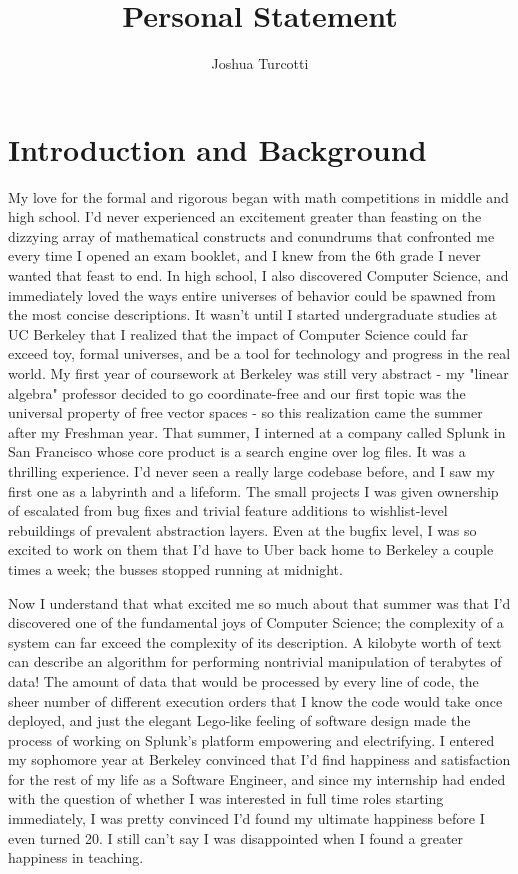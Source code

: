 \documentclass{nsf-grfp}
\title{Personal Statement}
\author{Joshua Turcotti}
\begin{document}
\maketitle

\section*{Introduction and Background}

My love for the formal and rigorous began with math competitions in middle and high school. I'd never experienced an excitement greater than feasting on the dizzying array of mathematical constructs and conundrums that confronted me every time I opened an exam booklet, and I knew from the 6th grade I never wanted that feast to end. In high school, I also discovered Computer Science, and immediately loved the ways entire universes of behavior could be spawned from the most concise descriptions. It wasn't until I started undergraduate studies at UC Berkeley that I realized that the impact of Computer Science could far exceed toy, formal universes, and be a tool for technology and progress in the real world. My first year of coursework at Berkeley was still very abstract - my "linear algebra" professor decided to go coordinate-free and our first topic was the universal property of free vector spaces - so this realization came the summer after my Freshman year. That summer, I interned at a company called Splunk in San Francisco whose core product is a search engine over log files. It was a thrilling experience. I'd never seen a really large codebase before, and I saw my first one as a labyrinth and a lifeform. The small projects I was given ownership of escalated from bug fixes and trivial feature additions to wishlist-level rebuildings of prevalent abstraction layers. Even at the bugfix level, I was so excited to work on them that I'd have to Uber back home to Berkeley a couple times a week; the busses stopped running at midnight. 

Now I understand that what excited me so much about that summer was that I'd discovered one of the fundamental joys of Computer Science; the complexity of a system can far exceed the complexity of its description. A kilobyte worth of text can describe an algorithm for performing nontrivial manipulation of terabytes of data! The amount of data that would be processed by every line of code, the sheer number of different execution orders that I know the code would take once deployed, and just the elegant Lego-like feeling of software design made the process of working on Splunk's platform empowering and electrifying. I entered my sophomore year at Berkeley convinced that I'd find happiness and satisfaction for the rest of my life as a Software Engineer, and since my internship had ended with the question of whether I was interested in full time roles starting immediately, I was pretty convinced I'd found my ultimate happiness before I even turned 20. I still can't say I was disappointed when I found a greater happiness in teaching.
\end{document}
